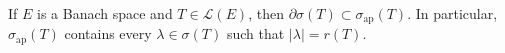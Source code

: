 If $E$ is a Banach space and $T \in \mathcal{L}(E)$, then $\partial \sigma(T) \subset \sigma_{\text{ap}}(T)$. In particular, $\sigma_{\text{ap}}(T)$ contains every $\lambda \in \sigma(T)$ such that $|\lambda| = r(T)$.
